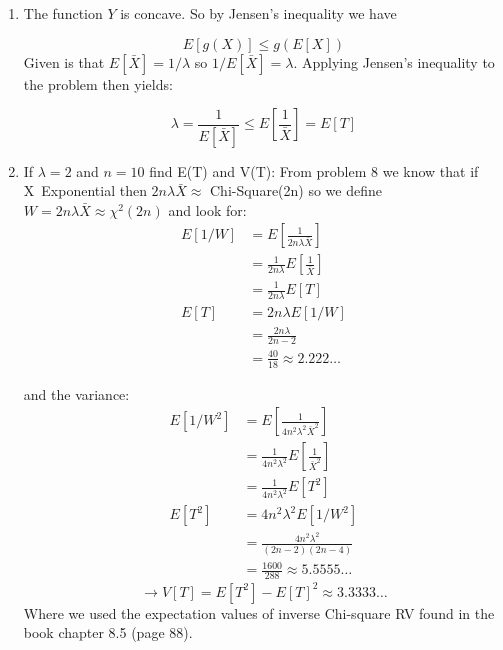 \documentclass{article}
\newcommand{\1}{\mathbf{1}}
\begin{document}
\begin{enumerate}
    \item The function $Y$ is concave. So by Jensen's inequality we have
    
    $$E[g(X)] \leq g\left( E[X] \right)$$
    Given is that $E[\bar X] = 1/\lambda$ so $1/E[\bar X] = \lambda$. Applying Jensen's inequality to the problem then yields:
    
    $$\lambda = \frac{1}{E[\bar X]} \leq E\left[\frac{1}{\bar X}\right] = E[T]$$
    
    \item If $\lambda =2$ and $n=10$ find E(T) and V(T):
    From problem 8 we know that if X~Exponential then $2n\lambda\bar X \approx$ Chi-Square(2n) so we define $W=2n\lambda\bar X \approx \chi^2(2n)$ and look for:
    \begin{align*}
        E[1/W] &= E\left[ \frac{1}{2n\lambda\bar X} \right] \\
        &= \frac{1}{2n\lambda} E\left[ \frac{1}{\bar X} \right] \\
        &= \frac{1}{2n\lambda} E[T] \\
        E[T] &= 2n\lambda E[1/W] \\
        &= \frac{2n\lambda}{2n -2} \\
        &= \frac{40}{18} \approx 2.222\hdots
    \end{align*}
    
    and the variance:
    \begin{align*}
        E[1/W^2] &= E\left[ \frac{1}{4n^2\lambda^2\bar X^2} \right] \\
        &= \frac{1}{4n^2\lambda^2} E\left[ \frac{1}{\bar X^2} \right] \\
        &= \frac{1}{4n^2\lambda^2} E[T^2] \\
        E[T^2] &= 4n^2\lambda^2 E[1/W^2] \\
        &= \frac{4n^2\lambda^2}{(2n -2)(2n-4)} \\
        &= \frac{1600}{288} \approx 5.5555\hdots
    \end{align*}
    $$\rightarrow V[T] = E[T^2] - E[T]^2 \approx 3.3333\hdots$$
    Where we used the expectation values of inverse Chi-square RV found in the book chapter 8.5 (page 88). 
\end{enumerate}
\end{document}
